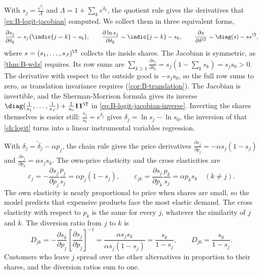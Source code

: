 With $s_j = \frac{e^{\delta_j}}{\Lambda}$ and $\Lambda = 1 + \sum_ke^{\delta_k}$, the quotient rule gives the derivatives
that \cref{ex:B-logit-jacobian} computed. We collect them in three equivalent forms,
\begin{equation}\label{eq:B-logit-deriv}
\frac{\partial s_j}{\partial\delta_k} = s_j\big(\indic\{j = k\} - s_k\big),
\qquad
\frac{\partial\ln s_j}{\partial\delta_k} = \indic\{j = k\} - s_k,
\qquad
\frac{\partial s}{\partial\delta^\T} = \diag(s) - ss^\T,
\end{equation}
where $s = (s_1, \dots, s_J)^\T$ collects the inside shares. The Jacobian is symmetric, as \cref{thm:B-wdz}
requires. Its row sums are $\sum_{k \geq 1}\frac{\partial s_j}{\partial\delta_k} = s_j(1 - \sum_ks_k) = s_js_0 > 0$. The
derivative with respect to the outside good is $-s_js_0$, so the full row sums to zero, as translation
invariance requires (\cref{cor:B-translation}). The Jacobian is invertible, and the Sherman-Morrison formula gives
its inverse $\diag(\frac{1}{s_1}, \dots, \frac{1}{s_J}) + \frac{1}{s_0}\mathbf{1}\mathbf{1}^\T$ in
\eqref{eq:B-logit-jacobian-inverse}. Inverting the shares themselves is easier still:
$\frac{s_j}{s_0} = e^{\delta_j}$ gives $\delta_j = \ln s_j - \ln s_0$, the inversion of \citet{Berry1994} that
\cref{ch:logit} turns into a linear instrumental variables regression.

With $\delta_j = \tilde\delta_j - \alpha p_j$, the chain rule gives the price derivatives
$\frac{\partial s_j}{\partial p_j} = -\alpha s_j(1 - s_j)$ and $\frac{\partial s_j}{\partial p_k} = \alpha s_js_k$. The own-price
elasticity and the cross elasticities are
\begin{equation}\label{eq:B-logit-elast}
\varepsilon_j = -\frac{\partial s_j}{\partial p_j}\frac{p_j}{s_j} = \alpha p_j(1 - s_j),
\qquad
\varepsilon_{jk} = \frac{\partial s_j}{\partial p_k}\frac{p_k}{s_j} = \alpha p_ks_k \quad (k \neq j).
\end{equation}
The own elasticity is nearly proportional to price when shares are small, so the model predicts that
expensive products face the most elastic demand. The cross elasticity with respect to $p_k$ is the same for
every $j$, whatever the similarity of $j$ and $k$. The diversion ratio from $j$ to $k$ is
\begin{equation}\label{eq:B-logit-diversion}
D_{jk} = -\frac{\partial s_k}{\partial p_j}\left[\frac{\partial s_j}{\partial p_j}\right]^{-1} = \frac{\alpha s_js_k}{\alpha s_j(1 - s_j)} = \frac{s_k}{1 - s_j},
\qquad
D_{j0} = \frac{s_0}{1 - s_j} .
\end{equation}
Customers who leave $j$ spread over the other alternatives in proportion to their shares, and the
diversion ratios sum to one.

